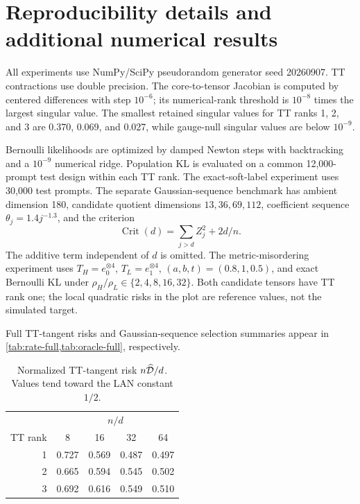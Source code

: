 \section{Reproducibility details and additional numerical results}
\label{app:experiments}

All experiments use NumPy/SciPy pseudorandom generator seed 20260907. TT contractions use double precision. The core-to-tensor Jacobian is computed by centered differences with step \(10^{-6}\); its numerical-rank threshold is \(10^{-8}\) times the largest singular value. The smallest retained singular values for TT ranks 1, 2, and 3 are 0.370, 0.069, and 0.027, while gauge-null singular values are below \(10^{-9}\).

Bernoulli likelihoods are optimized by damped Newton steps with backtracking and a \(10^{-9}\) numerical ridge. Population KL is evaluated on a common 12,000-prompt test design within each TT rank. The exact-soft-label experiment uses 30,000 test prompts. The separate Gaussian-sequence benchmark has ambient dimension 180, candidate quotient dimensions \(13,36,69,112\), coefficient sequence
\(\theta_j=1.4j^{-1.3}\), and the criterion
\[
\operatorname{Crit}(d)=\sum_{j>d}Z_j^2+2d/n.
\]
The additive term independent of \(d\) is omitted.  The metric-misordering
experiment uses \(T_H=e_0^{\otimes4}\), \(T_L=e_1^{\otimes4}\),
\((a,b,t)=(0.8,1,0.5)\), and exact Bernoulli KL under
\(\rho_H/\rho_L\in\{2,4,8,16,32\}\).  Both candidate tensors have TT rank
one; the local quadratic risks in the plot are reference values, not the
simulated target.

Full TT-tangent risks and Gaussian-sequence selection summaries appear in
\cref{tab:rate-full,tab:oracle-full}, respectively.

\begin{table}[ht]
\centering
\caption{Normalized TT-tangent risk \(n\widehat{\mathcal D}/d\). Values tend toward the LAN constant \(1/2\).}
\label{tab:rate-full}
\begin{tabular}{rcccc}
\toprule
& \multicolumn{4}{c}{\(n/d\)}\\
TT rank & 8 & 16 & 32 & 64\\
\midrule
1 & 0.727 & 0.569 & 0.487 & 0.497\\
2 & 0.665 & 0.594 & 0.545 & 0.502\\
3 & 0.692 & 0.616 & 0.549 & 0.510\\
\bottomrule
\end{tabular}
\end{table}

